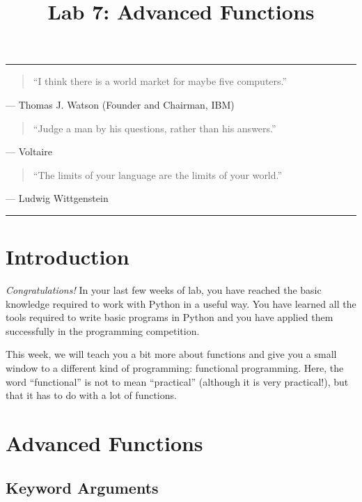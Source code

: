 \documentclass[11pt]{cselabheader}
\title{Lab 7: Advanced Functions}
\begin{document}
\maketitle

\hrule
\begin{quotation}
``I think there is a world market for maybe five computers.''
\end{quotation}
\begin{flushright}
--- Thomas J. Watson (Founder and Chairman, IBM)
\end{flushright}

\begin{quotation}
``Judge a man by his questions, rather than his answers.''
\end{quotation}
\begin{flushright}
--- Voltaire
\end{flushright}

\begin{quotation}
``The limits of your language are the limits of your world.''
\end{quotation}
\begin{flushright}
--- Ludwig Wittgenstein
\end{flushright}

\hrule

\section{Introduction}
\emph{Congratulations!} In your last few weeks of lab, you have reached the
basic knowledge required to work with Python in a useful way. You have learned
all the tools required to write basic programs in Python and you have applied
them successfully in the programming competition.

This week, we will teach you a bit more about functions and give you a small
window to a different kind of programming: functional programming. Here, the
word ``functional'' is not to mean ``practical'' (although it is very
practical!), but that it has to do with a lot of functions.

\pagebreak
\section{Advanced Functions}
\label{sec:advfun}

\subsection{Keyword Arguments}
\label{subsec:adv.args}
\end{document}
